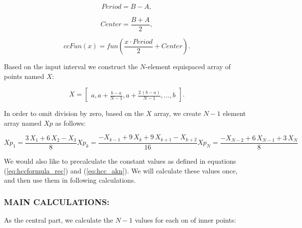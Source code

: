 \documentclass[12pt,twoside,a4paper]{article}
\numberwithin{equation}{subsection}
\numberwithin{figure}{subsection}
\begin{document}
\begin{equation} \label{eq:cci_period}
	Period = B - A,
\end{equation}

\begin{equation} \label{eq:cci_center}
	Center = \frac{B + A}{2},
\end{equation}

\begin{equation} \label{eq:cci_cecfun}
	ccFun(x) = fun( \frac{x \cdot Period}{2} + Center).
\end{equation}


Based on the input interval we construct the $N$-element equispaced array of points named $X$:

\begin{equation}
	X = \begin{bmatrix}
			a, a + \frac{b-a}{N-1}, a + \frac{2 \, (b - a)}{N-1}, \ldots, b
		\end{bmatrix}.
\end{equation}

In order to omit division by zero, based on the $X$ array, we create $N-1$ element array named $Xp$ as follows:

\begin{subequations} \label{eq:cci_cubicinterpolation}
  \begin{equation}   \label{eq:ccicinterp_first}
    Xp_1 = \frac {3 \, X_1 + 6 \, X_2 - X_3}{8}
  \end{equation}
  \begin{equation}   \label{eq:ccicinterp_next}
    Xp_k = \frac { - X_{k - 1} + 9 \, X_k + 9 \, X_{k + 1} - X_{k + 2}}{16}
  \end{equation}
  \begin{equation}   \label{eq:ccicinterp_last}
    Xp_N = \frac { - X_{N - 2} + 6 \, X_{N - 1} + 3 \, X_N}{8}
  \end{equation}
\end{subequations}

We would also like to precalculate the constant values as defined in equations (\ref{eq:hccformula_rec}) and (\ref{eq:hcc_akn}). We will
calculate these values once, and then use them in following calculations.

\subsubsection*{MAIN CALCULATIONS:}
As the central part, we calculate the $N-1$ values for each on of inner points: 
\end{document}
